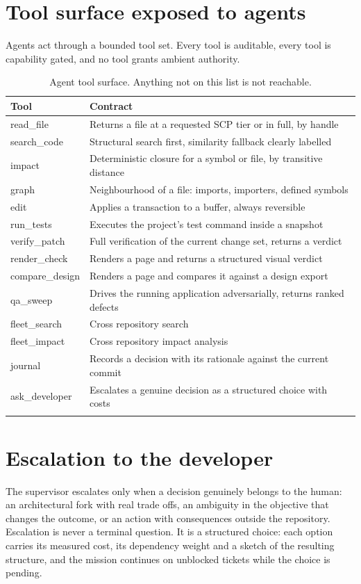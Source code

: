 \section{Tool surface exposed to agents}

Agents act through a bounded tool set. Every tool is auditable, every tool is capability
gated, and no tool grants ambient authority.

\begin{longtable}{@{}p{} p{}@{}}
\toprule
\textbf{Tool} & \textbf{Contract} \\
\midrule
\endhead
read\_file & Returns a file at a requested SCP tier or in full, by handle \\
search\_code & Structural search first, similarity fallback clearly labelled \\
impact & Deterministic closure for a symbol or file, by transitive distance \\
graph & Neighbourhood of a file: imports, importers, defined symbols \\
edit & Applies a transaction to a buffer, always reversible \\
run\_tests & Executes the project's test command inside a snapshot \\
verify\_patch & Full verification of the current change set, returns a verdict \\
render\_check & Renders a page and returns a structured visual verdict \\
compare\_design & Renders a page and compares it against a design export \\
qa\_sweep & Drives the running application adversarially, returns ranked defects \\
fleet\_search & Cross repository search \\
fleet\_impact & Cross repository impact analysis \\
journal & Records a decision with its rationale against the current commit \\
ask\_developer & Escalates a genuine decision as a structured choice with costs \\
\bottomrule
\caption{Agent tool surface. Anything not on this list is not reachable.}
\end{longtable}

\section{Escalation to the developer}

The supervisor escalates only when a decision genuinely belongs to the human: an
architectural fork with real trade offs, an ambiguity in the objective that changes the
outcome, or an action with consequences outside the repository. Escalation is never a
terminal question. It is a structured choice: each option carries its measured cost, its
dependency weight and a sketch of the resulting structure, and the mission continues on
unblocked tickets while the choice is pending.
